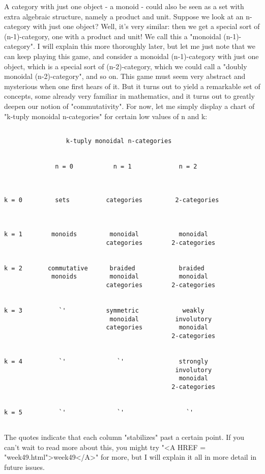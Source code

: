 A category with just one object - a monoid - could also be seen as a set
with extra algebraic structure, namely a product and unit.  Suppose we
look at an n-category with just one object?  Well, it's very similar:
then we get a special sort of (n-1)-category, one with a product and
unit!  We call this a "monoidal (n-1)-category".  I will
explain this more thoroughly later, but let me just note that we can
keep playing this game, and consider a monoidal (n-1)-category with just
one object, which is a special sort of (n-2)-category, which we could
call a "doubly monoidal (n-2)-category", and so on.  This game
must seem very abstract and mysterious when one first hears of it.  But
it turns out to yield a remarkable set of concepts, some already very
familiar in mathematics, and it turns out to greatly deepen our notion
of "commutativity".  For now, let me simply display a chart of
"k-tuply monoidal n-categories" for certain low values of n
and k:


\begin{verbatim}

                 k-tuply monoidal n-categories


              n = 0           n = 1             n = 2



k = 0         sets          categories         2-categories
     


k = 1        monoids         monoidal           monoidal
                            categories        2-categories


k = 2       commutative      braided            braided
             monoids         monoidal           monoidal
                            categories        2-categories 


k = 3          `'           symmetric            weakly
                             monoidal          involutory
                            categories          monoidal
                                              2-categories


k = 4          `'              `'               strongly 
                                               involutory
                                                monoidal
                                              2-categories


k = 5          `'              `'                 `'


\end{verbatim}
    
The quotes indicate that each column "stabilizes" past a certain
point.  If you can't wait to read more about this, you might try
"<A HREF = "week49.html">week49</A>" for more, but I will explain it all in more detail in future
issues.   

